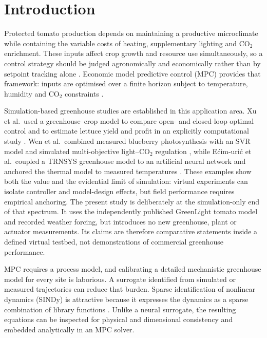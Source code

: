 \section{Introduction}
\label{sec:intro}

Protected tomato production depends on maintaining a productive microclimate while
containing the variable costs of heating, supplementary lighting and CO$_2$ enrichment.
These inputs affect crop growth and resource use simultaneously, so a control strategy
should be judged agronomically and economically rather than by setpoint tracking alone
\cite{katzin2020,katzin2021}. Economic model predictive control (MPC) provides that
framework: inputs are optimised over a finite horizon subject to temperature, humidity and
CO$_2$ constraints \cite{vanhenten1994,mayne2000,rawlings2012,lin2021}.

Simulation-based greenhouse studies are established in this application area. Xu et al.\
used a greenhouse--crop model to compare open- and closed-loop optimal control and to
estimate lettuce yield and profit in an explicitly computational study
\cite{xu2023agronomy}. Wen et al.\ combined measured blueberry photosynthesis with an SVR
model and simulated multi-objective light--CO$_2$ regulation
\cite{wen2022agronomy}, while E{\'c}im-{\DJ}uri{\'c} et al.\ coupled a TRNSYS greenhouse
model to an artificial neural network and anchored the thermal model to measured
temperatures \cite{ecimduric2024}. These examples show both the value and the evidential
limit of simulation: virtual experiments can isolate controller and model-design effects,
but field performance requires empirical anchoring. The present study is deliberately at
the simulation-only end of that spectrum. It uses the independently published GreenLight
tomato model and recorded weather forcing, but introduces no new greenhouse, plant or
actuator measurements. Its claims are therefore comparative statements inside a defined
virtual testbed, not demonstrations of commercial greenhouse performance.

MPC requires a process model, and calibrating a detailed mechanistic greenhouse model for
every site is laborious. A surrogate identified from simulated or measured trajectories
can reduce that burden. Sparse identification of nonlinear dynamics (SINDy) is attractive
because it expresses the dynamics as a sparse combination of library functions
\cite{brunton2016,brunton2016c,kaiser2018,fasel2022}. Unlike a neural surrogate, the
resulting equations can be inspected for physical and dimensional consistency and embedded
analytically in an MPC solver.

